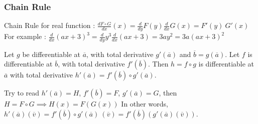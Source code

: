 \subsubsection{Chain Rule}
\begin{commentary}
	Chain Rule for real function : $\frac{d F \circ G}{dx}(x) = \frac{d}{dy}F(y) \frac{d}{dx}G(x) = F'(y)\ G'(x)$\\
	For example : $\frac{d}{dx} (ax+3)^3 = \frac{d}{dy}y^3 \frac{d}{dx} \left(ax+3\right) = 3ay^2 = 3a(ax+3)^2$
\end{commentary}
\begin{theorem}
	Let $g$ be differentiable at $\overline{a}$, with total derivative $g'(\overline{a})$ and $\overline{b} = g(\overline{a})$.
	Let $f$ is differentiable at $\overline{b}$, with total derivative $f'(\overline{b})$.
	Then $h = f \circ g$ is differentiable at $\overline{a}$ with total derivative $h'(\overline{a}) = f'(\overline{b}) \circ g'(\overline{a})$.
\begin{commentary}
	Try to read $h'(\overline{a}) = H$, $f'(\overline{b}) = F$, $g'(\overline{a}) = G$, then $H = F \circ G \implies H(x) = F(G(x))$
	In other words, $h'(\overline{a})(\overline{v}) = f'(\overline{b}) \circ g'(\overline{a})\ (\overline{v}) = f'(\overline{b})(g'(\overline{a})(\overline{v}))$.
\end{commentary}
\end{theorem}
